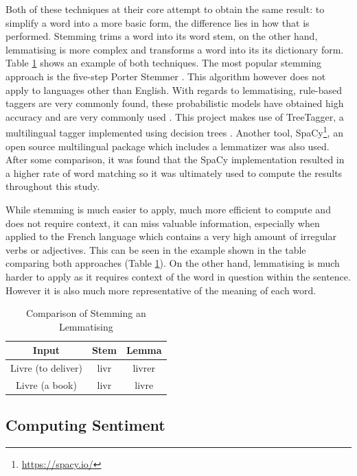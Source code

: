 Both of these techniques at their core attempt to obtain the same result: to simplify a word into a more basic form, the difference lies in how that is performed. Stemming trims a word into its word stem, on the other hand, lemmatising is more complex and transforms a word into its its dictionary form. Table \ref{tab:stem and lemma} shows an example of both techniques. The most popular stemming approach is the five-step Porter Stemmer \citep{porter1980algorithm}. This algorithm however does not apply to languages other than English. With regards to lemmatising, rule-based taggers are very commonly found, these probabilistic models have obtained high accuracy and are very commonly used \citep{brill1992simple}. This project makes use of TreeTagger, a multilingual tagger implemented using decision trees \citep{schmid2013probabilistic}. Another tool, SpaCy\footnote{\url{https://spacy.io/}}, an open source multilingual package which includes a lemmatizer was also used. After some comparison, it was found that the SpaCy implementation resulted in a higher rate of word matching so it was ultimately used to compute the results throughout this study.

While stemming is much easier to apply, much more efficient to compute and does not require context, it can miss valuable information, especially when applied to the French language which contains a very high amount of irregular verbs or adjectives. This can be seen in the example shown in the table comparing both approaches (Table \ref{tab:stem and lemma}). On the other hand, lemmatising is much harder to apply as it requires context of the word in question within the sentence. However it is also much more representative of the meaning of each word. 

\begin{table}[H]
\centering
\begin{tabular}{@{}ccc@{}}
\toprule
\textbf{Input} & \textbf{Stem} & \textbf{Lemma} \\ \midrule
Livre (to deliver) & livr & livrer \\
Livre (a book) & livr & livre \\ \bottomrule
\end{tabular}
\caption{Comparison of Stemming an Lemmatising}
\label{tab:stem and lemma}
\end{table}

\subsection{Computing Sentiment}

